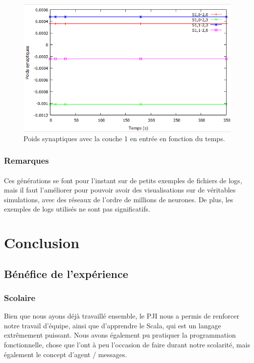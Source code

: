 \documentclass[a4paper,10pt]{article}
\begin{document}
\begin{figure}[!h]
\includegraphics[scale=0.75,right]{image/synapsesActivity.png}
\caption{Poids synaptiques avec la couche 1 en entrée en fonction du temps.}
\end{figure}

\subsubsection*{Remarques}
\paragraph{}
Ces générations se font pour l’instant sur de petits exemples de fichiers de logs, mais il faut l’améliorer  pour pouvoir avoir des visualisations sur de véritables simulations, avec des réseaux de l’ordre de millions de neurones.
De plus, les exemples de logs utilisés ne sont pas significatifs.

\newpage

\section*{Conclusion}

\subsection*{Bénéfice de l'expérience}
\subsubsection*{Scolaire}
Bien que nous ayons déjà travaillé ensemble, le PJI nous a permis de renforcer notre travail d'équipe, ainsi que d'apprendre  le Scala, qui est un langage extrêmement puissant. Nous avons également pu pratiquer la programmation fonctionnelle, chose que l'ont à peu l'occasion de faire durant notre scolarité, mais également le concept d'agent / messages.
\end{document}
